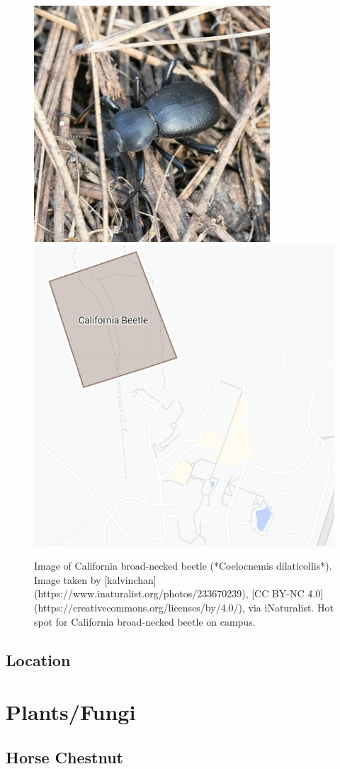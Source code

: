 \documentclass[
]{book}
\begin{document}
\begin{figure}

{\centering \includegraphics[width=0.49\linewidth,height=0.2\textheight]{insect_images/cali_beet_11} \includegraphics[width=0.49\linewidth,height=0.2\textheight]{insect_images/cali_beet_hotspot_11} 

}

\caption{Image of California broad-necked beetle (*Coelocnemis dilaticollis*). Image taken by [kalvinchan](https://www.inaturalist.org/photos/233670239), [CC BY-NC 4.0](https://creativecommons.org/licenses/by/4.0/), via iNaturalist. Hot spot for California broad-necked beetle on campus.}\label{fig:unnamed-chunk-10}
\end{figure}

\hypertarget{location-1}{%
\section{Location}\label{location-1}}

\hypertarget{plantsfungi}{%
\chapter{Plants/Fungi}\label{plantsfungi}}

\hypertarget{horse-chestnut}{%
\section{Horse Chestnut}\label{horse-chestnut}}
\end{document}
